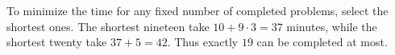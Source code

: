 To minimize the time for any fixed number of completed problems, select the shortest ones. The shortest nineteen take $ 10+9\cdot3=37 $ minutes, while the shortest twenty take $ 37+5=42 $. Thus exactly $\boxed{19}$ can be completed at most.
